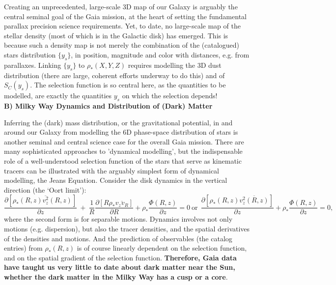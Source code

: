 Creating an unprecedented, large-scale 3D map of our Galaxy is arguably the central seminal goal of the Gaia mission, at the heart of setting the fundamental parallax precision science requirements. Yet, to date, no large-scale map of the stellar density (most of which is in the Galactic disk) has emerged. This is because 
such a density map is not merely the combination of the (catalogued) stars distribution $\{y_s\}$, in position, magnitude and color with distances, e.g. from parallaxes. Linking $\{y_s\}$ to $\rho_*(X,Y,Z)$ requires modelling the 3D dust distribution (there are large, coherent efforts underway to do this) and of $S_C(y_s)$. The selection function is so central here, as the quantities to be modelled, are exactly the quantities $y_s$ on which the selection depends!
\\

\noindent\textbf{B) Milky Way Dynamics and Distribution of (Dark) Matter}

Inferring the (dark) mass distribution, or the gravitational potential, in and around our Galaxy from modelling the 6D phase-space distribution of stars is another seminal and central science case for the overall Gaia mission. There are many sophisticated approaches to 'dynamical modelling', but the indispensable role of a well-understood selection function of the stars that serve as kinematic tracers can be illustrated with the arguably simplest form of dynamical modelling, the Jeans Equation. Consider the disk dynamics in the vertical direction (the `Oort limit'):
\begin{equation}
    \frac{\partial[\rho_*(R,z) \overline{v_z^2}(R,z)]}{\partial z}~+~\frac{1}{R}
    \frac{\partial[R \rho_* \overline{v_z v_R}]}{\partial R} + \rho_*\frac{\Phi(R,z)}{\partial z}=0 \mathrm{\ or\ \ } \frac{\partial[\rho_*(R,z) \overline{v_z^2(R,z)}]}{\partial z} + \rho_*\frac{\Phi(R,z)}{\partial z}=0,
    \label{eqn:Jeans}
\end{equation}
where the second form is for separable motions. Dynamics involves not only motions (e.g. dispersion), but also the tracer densities, and the spatial derivatives of the densities and motions. And the prediction of observables (the catalog entries) from $\rho_*(R,z)$ is of course linearly dependent on the selection function, and
on the spatial gradient of the selection function. \textbf{Therefore, Gaia data have taught us very little to date about dark matter near the Sun, whether the dark matter in the Milky Way has a cusp or a core}.

